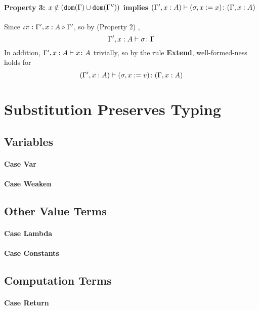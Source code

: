 {        \paragraph{Property 3: $x \notin (\texttt{dom}(\Gamma) \cup \texttt{dom}(\Gamma''))$ implies $(\Gamma', x: A) \vdash (\sigma, x := x) \colon (\Gamma, x: A)$} 
        Since $\iota\pi : \Gamma',x: A \triangleright \Gamma'$, so by (Property 2) , 
        $$\Gamma', x: A \vdash \sigma \colon \Gamma$$
        In addition, $\Gamma', x: A \vdash x \colon A$ trivially, so by the rule \textbf{Extend}, well-formed-ness holds for
        \begin{equation}
            (\Gamma', x:A) \vdash (\sigma, x:= v) \colon (\Gamma, x: A)
        \end{equation}
    

    \section{Substitution Preserves Typing}
    
    \subsection{Variables}  
        \paragraph{Case Var}
           
            
        \paragraph{Case Weaken}
           
    \subsection{Other Value Terms}
    \paragraph{Case Lambda}
    \paragraph{Case Constants}
        
    \subsection{Computation Terms}
    \paragraph{Case Return}
      
}
